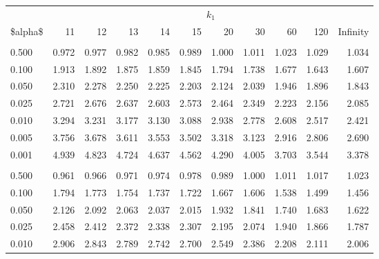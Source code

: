 \documentclass[
]{article}
\begin{document}
\begin{longtable}[t]{lrrrrrrrrrr}
\toprule
\multicolumn{1}{c}{ } & \multicolumn{10}{c}{$k_1$} \\
\cmidrule(l{3pt}r{3pt}){2-11}
\$alpha\$ & 11 & 12 & 13 & 14 & 15 & 20 & 30 & 60 & 120 & Infinity\\
\midrule
\addlinespace[0.3em]
\multicolumn{11}{l}{\textbf{$k_2=20$}}\\
\hspace{1em}0.500 & 0.972 & 0.977 & 0.982 & 0.985 & 0.989 & 1.000 & 1.011 & 1.023 & 1.029 & 1.034\\
\hspace{1em}0.100 & 1.913 & 1.892 & 1.875 & 1.859 & 1.845 & 1.794 & 1.738 & 1.677 & 1.643 & 1.607\\
\hspace{1em}0.050 & 2.310 & 2.278 & 2.250 & 2.225 & 2.203 & 2.124 & 2.039 & 1.946 & 1.896 & 1.843\\
\hspace{1em}0.025 & 2.721 & 2.676 & 2.637 & 2.603 & 2.573 & 2.464 & 2.349 & 2.223 & 2.156 & 2.085\\
\hspace{1em}0.010 & 3.294 & 3.231 & 3.177 & 3.130 & 3.088 & 2.938 & 2.778 & 2.608 & 2.517 & 2.421\\
\hspace{1em}0.005 & 3.756 & 3.678 & 3.611 & 3.553 & 3.502 & 3.318 & 3.123 & 2.916 & 2.806 & 2.690\\
\hspace{1em}0.001 & 4.939 & 4.823 & 4.724 & 4.637 & 4.562 & 4.290 & 4.005 & 3.703 & 3.544 & 3.378\\
\addlinespace[0.3em]
\multicolumn{11}{l}{\textbf{$k_2=30$}}\\
\hspace{1em}0.500 & 0.961 & 0.966 & 0.971 & 0.974 & 0.978 & 0.989 & 1.000 & 1.011 & 1.017 & 1.023\\
\hspace{1em}0.100 & 1.794 & 1.773 & 1.754 & 1.737 & 1.722 & 1.667 & 1.606 & 1.538 & 1.499 & 1.456\\
\hspace{1em}0.050 & 2.126 & 2.092 & 2.063 & 2.037 & 2.015 & 1.932 & 1.841 & 1.740 & 1.683 & 1.622\\
\hspace{1em}0.025 & 2.458 & 2.412 & 2.372 & 2.338 & 2.307 & 2.195 & 2.074 & 1.940 & 1.866 & 1.787\\
\hspace{1em}0.010 & 2.906 & 2.843 & 2.789 & 2.742 & 2.700 & 2.549 & 2.386 & 2.208 & 2.111 & 2.006\\

\end{longtable}
\end{document}
